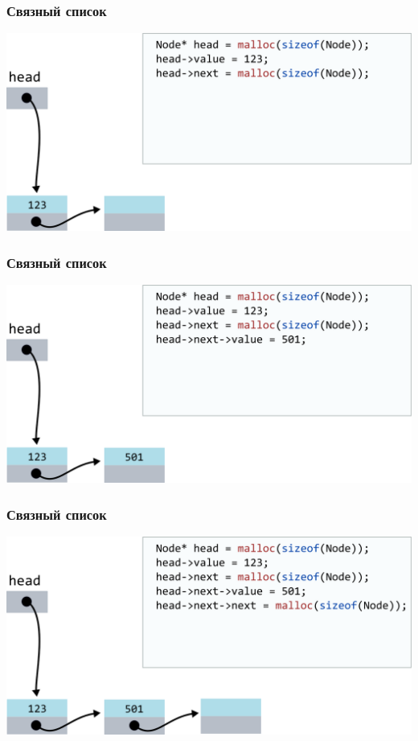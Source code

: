 \documentclass[10pt,pdf,hyperref={unicode}]{beamer}
\begin{document}
\begin{frame}[fragile]
\frametitle{Связный список}
\begin{center}
\includegraphics[scale=0.6]{images/list/codelist4.png}
\end{center}
\end{frame}


\begin{frame}[fragile]
\frametitle{Связный список}
\begin{center}
\includegraphics[scale=0.6]{images/list/codelist5.png}
\end{center}
\end{frame}


\begin{frame}[fragile]
\frametitle{Связный список}
\begin{center}
\includegraphics[scale=0.6]{images/list/codelist6.png}
\end{center}
\end{frame}
\end{document}
